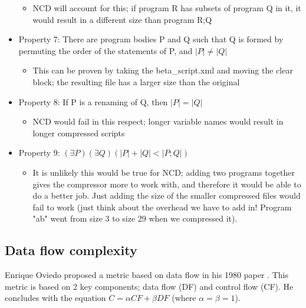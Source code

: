 \documentclass[]{article}
\begin{document}
\begin{itemize}
	\begin{itemize}
		\item NCD will account for this; if program R has subsets of program Q in it, it would result in a different size than program R;Q
	\end{itemize}
	\item Property 7: There are program bodies P and Q such that Q is formed by permuting the order of the statements of P, and $|P| \neq |Q|$
	\begin{itemize}
		\item This can be proven by taking the beta\_script.xml and moving the clear block; the resulting file has a larger size than the original
	\end{itemize}
	\item Property 8: If P is a renaming of Q, then $|P| = |Q|$
	\begin{itemize}
		\item NCD would fail in this respect; longer variable names would result in longer compressed scripts
	\end{itemize}
	\item Property 9: $(\exists P)(\exists Q)(|P|+|Q| < |P; Q|)$
	\begin{itemize}
		\item It is unlikely this would be true for NCD; adding two programs together gives the compressor more to work with, and therefore it would be able to do a better job. Just adding the size of the smaller compressed files would fail to work (just think about the overhead we have to add in! Program "ab" went from size 3 to size 29 when we compressed it).
	\end{itemize}
\end{itemize}



\subsection{Data flow complexity}

Enrique Oviedo proposed a metric based on data flow in his 1980 paper \cite{ref:oviedo1993control}.
This metric is based on 2 key components; data flow (DF) and control flow (CF).
He concludes with the equation $C = \alpha CF + \beta DF$ (where $\alpha=\beta=1$).
\end{document}

